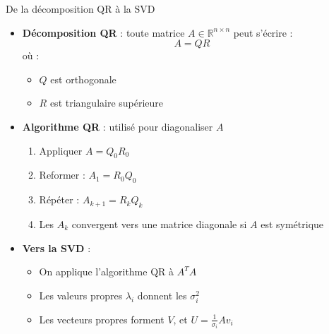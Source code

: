 
\begin{frame}{De la décomposition QR à la SVD}
\begin{itemize}
  \item \textbf{Décomposition QR} : toute matrice \( A \in \mathbb{R}^{n \times n} \) peut s’écrire :
  \[
    A = QR
  \]
  où :
  \begin{itemize}
    \pause
    \item \( Q \) est orthogonale \pause
    \item \( R \) est triangulaire supérieure
  \end{itemize}

  \pause
  \item \textbf{Algorithme QR} : utilisé pour diagonaliser \( A \)
  \begin{enumerate}
    \item Appliquer \( A = Q_0 R_0 \) \pause
    \item Reformer : \( A_1 = R_0 Q_0 \) \pause
    \item Répéter : \( A_{k+1} = R_k Q_k \) \pause
    \item Les \( A_k \) convergent vers une matrice diagonale si \( A \) est symétrique
  \end{enumerate}

  \pause
  \item \textbf{Vers la SVD} :
  \begin{itemize}
    \item On applique l'algorithme QR à \( A^T A \) \pause
    \item Les valeurs propres \( \lambda_i \) donnent les \( \sigma_i^2 \) \pause
    \item Les vecteurs propres forment \( V \), et \( U = \frac{1}{\sigma_i} A v_i \)
  \end{itemize}
\end{itemize}
\end{frame}
